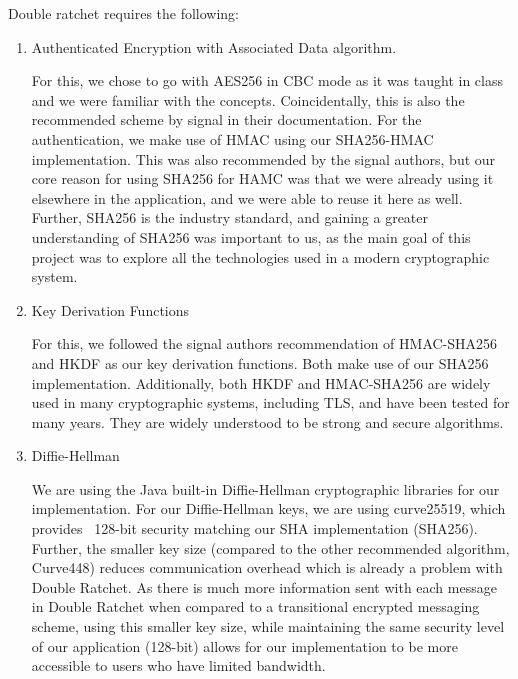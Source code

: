 Double ratchet requires the following:
\begin{enumerate}
    \item Authenticated Encryption with Associated Data algorithm.
        
        For this, we chose to go with AES256 in CBC mode as it was taught in class
        and we were familiar with the concepts. Coincidentally, this is also the recommended 
        scheme by signal in their documentation. For the authentication, we make use of HMAC using 
        our SHA256-HMAC implementation. This was also recommended by the signal authors, but our core
        reason for using SHA256 for HAMC was that we were already using it elsewhere in the application,
        and we were able to reuse it here as well. Further, SHA256 is the industry standard, and gaining a 
        greater understanding of SHA256 was important to us, as the main goal of this project was to 
        explore all the technologies used in a modern cryptographic system.

    \item Key Derivation Functions 

        For this, we followed the signal authors recommendation of HMAC-SHA256 and HKDF as our 
        key derivation functions. Both make use of our SHA256 implementation. Additionally,
        both HKDF and HMAC-SHA256 are widely used in many cryptographic systems, including TLS,
        and have been tested for many years. They are widely understood to be strong and secure algorithms.

    \item Diffie-Hellman

        We are using the Java built-in Diffie-Hellman cryptographic libraries for our implementation.
        For our Diffie-Hellman keys, we are using curve25519, which provides ~128-bit security matching our SHA implementation (SHA256).
        Further, the smaller key size (compared to the other recommended algorithm, Curve448) reduces communication
        overhead which is already a problem with Double Ratchet. As there is much more information sent with each message in Double Ratchet 
        when compared to a transitional encrypted messaging scheme, using this smaller key size, while maintaining the same security level of our 
        application (128-bit) allows for our implementation to be more accessible to users who have limited bandwidth.
\end{enumerate}

